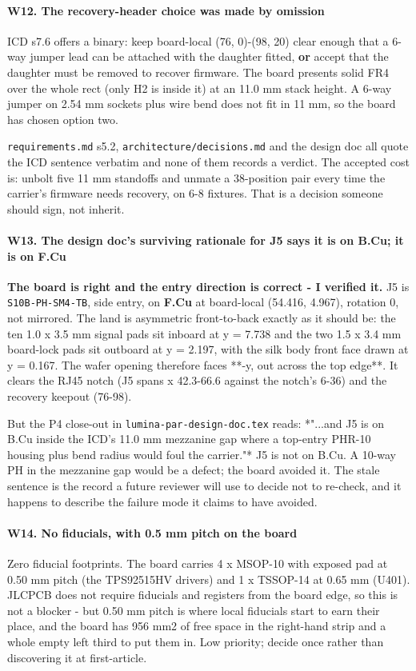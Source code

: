 \documentclass[11pt,a4paper]{article}
\begin{document}
\paragraph*{W12. The recovery-header choice was made by omission}
ICD s7.6 offers a binary: keep board-local (76, 0)-(98, 20) clear enough that a 6-way jumper lead can be attached with the daughter fitted, \textbf{or} accept that the daughter must be removed to recover firmware. The board presents solid FR4 over the whole rect (only H2 is inside it) at an 11.0 mm stack height. A 6-way jumper on 2.54 mm sockets plus wire bend does not fit in 11 mm, so the board has chosen option two.

\texttt{requirements.md} s5.2, \texttt{architecture/decisions.md} and the design doc all quote the ICD sentence verbatim and none of them records a verdict. The accepted cost is: unbolt five 11 mm standoffs and unmate a 38-position pair every time the carrier's firmware needs recovery, on 6-8 fixtures. That is a decision someone should sign, not inherit.

\paragraph*{W13. The design doc's surviving rationale for J5 says it is on B.Cu; it is on F.Cu}
\textbf{The board is right and the entry direction is correct - I verified it.} J5 is \texttt{S10B-PH-SM4-TB}, side entry, on \textbf{F.Cu} at board-local (54.416, 4.967), rotation 0, not mirrored. The land is asymmetric front-to-back exactly as it should be: the ten 1.0 x 3.5 mm signal pads sit inboard at y = 7.738 and the two 1.5 x 3.4 mm board-lock pads sit outboard at y = 2.197, with the silk body front face drawn at y = 0.167. The wafer opening therefore faces {*}{*}-y, out across the top edge{*}{*}. It clears the RJ45 notch (J5 spans x 42.3-66.6 against the notch's 6-36) and the recovery keepout (76-98).

But the P4 close-out in \texttt{lumina-par-design-doc.tex} reads: {*}"...and J5 is on B.Cu inside the ICD's 11.0 mm mezzanine gap where a top-entry PHR-10 housing plus bend radius would foul the carrier."{*} J5 is not on B.Cu. A 10-way PH in the mezzanine gap would be a defect; the board avoided it. The stale sentence is the record a future reviewer will use to decide not to re-check, and it happens to describe the failure mode it claims to have avoided.

\paragraph*{W14. No fiducials, with 0.5 mm pitch on the board}
Zero fiducial footprints. The board carries 4 x MSOP-10 with exposed pad at 0.50 mm pitch (the TPS92515HV drivers) and 1 x TSSOP-14 at 0.65 mm (U401). JLCPCB does not require fiducials and registers from the board edge, so this is not a blocker - but 0.50 mm pitch is where local fiducials start to earn their place, and the board has 956 mm2 of free space in the right-hand strip and a whole empty left third to put them in. Low priority; decide once rather than discovering it at first-article.
\end{document}
